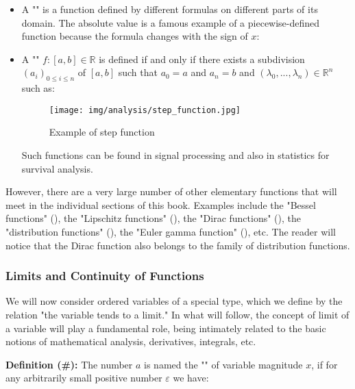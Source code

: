 \begin{enumerate}
\begin{itemize}
			 \item A "" is a function defined by different formulas on different parts of its domain. The absolute value is a famous example of a piecewise-defined function because the formula changes with the sign of $x$:
			 
			 
			 \item A "" $f:[a,b]\in \mathbb{R}$ is defined if and only if there exists a subdivision $(a_i)_{0\leq i \leq n}$ of $[a, b]$ such that $a_0=a$ and $a_n=b$ and $(\lambda_0,...,\lambda_n)\in \mathbb{R}^n$ such as:
			 
			\begin{figure}[H]
				\centering
				\texttt{[image: img/analysis/step\_function.jpg]}
				\caption{Example of step function}
			\end{figure}
			Such functions can be found in signal processing and also in statistics for survival analysis.
		\end{itemize}
		
		However, there are a very large number of other elementary functions that will meet in the individual sections of this book. Examples include the "Bessel functions" (), the "Lipschitz functions" (), the "Dirac functions" (), the "distribution functions" (), the "Euler gamma function" (), etc. The reader will notice that the Dirac function also belongs to the family of distribution functions.
	\end{enumerate}
	
	\subsubsection{Limits and Continuity of Functions}
	We will now consider ordered variables of a special type, which we define by the relation "the variable tends to a limit." In what will follow, the concept of limit of a variable will play a fundamental role, being intimately related to the basic notions of mathematical analysis, derivatives, integrals, etc.
	
	\textbf{Definition (\#\mydef):} The number $a$ is named the "" of variable magnitude $x$, if for any arbitrarily small positive number $\varepsilon$ we have:
	
